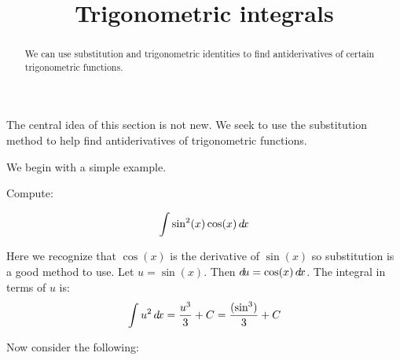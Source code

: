 \documentclass{ximera}
\title[Dig-In:]{Trigonometric integrals}
\begin{document}
\begin{abstract}
  We can use substitution and trigonometric identities to find antiderivatives of certain
  trigonometric functions.
\end{abstract}
\maketitle

The central idea of this section is not new. We seek to use the substitution method to help find antiderivatives of trigonometric functions. 

We begin with a simple example.

\begin{example}
Compute:

\[
\int \sin^{2}(x) \cos(x) \mathop{}\!d\! x
\]

\begin{explanation}
Here we recognize that $\cos(x)$ is the derivative of $\sin(x)$ so substitution is a good method to use. Let $u=\sin(x)$. Then $\mathop{}\!d\! u=\cos(x) \mathop{}\!d\! x$. 
The integral in terms of $u$ is:
\[ 
\int u^{2} \mathop{}\!d\! x=\frac{u^{3}}{3}+C=\frac{ (\sin^{3})}{3}+C
\]
\end{explanation}

\end{example}



Now consider the following:
\end{document}

